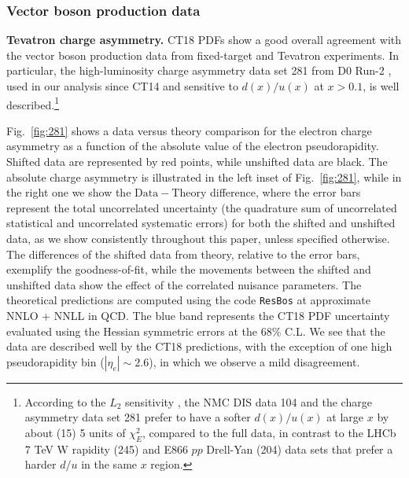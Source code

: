 \subsubsection{Vector boson production data}
\label{sec:QualityDYdata}
{\bf Tevatron charge asymmetry.}
CT18 PDFs show a good overall agreement with the vector boson production data from fixed-target and Tevatron experiments. In particular, the high-luminosity charge asymmetry data set 281 from D0 Run-2 \cite{D0:2014kma}, used in our analysis since CT14 \cite{Dulat:2015mca} and sensitive to $d(x)/u(x)$ at $x>0.1$, is well described.\footnote{According to the $L_2$ sensitivity \cite{CT18L2Sensitivity}, the NMC DIS data 104 and the charge asymmetry data set 281 prefer to have a softer $d(x)/u(x)$ at large $x$ by about (15) 5 units of $\chi^2_E$, compared to the full data, in contrast to the LHCb 7 TeV W rapidity (245) and E866 $pp$ Drell-Yan (204) data sets that prefer a harder $d/u$ in the same $x$ region.}

Fig.~\ref{fig:281} shows a data versus theory comparison for the electron charge asymmetry as a function of the absolute value of the electron pseudorapidity.
Shifted data are represented by red points, while unshifted data are black. 
The absolute charge asymmetry is illustrated in the left inset of Fig.~\ref{fig:281}, while in the right one we show the 
$\mathrm{Data}\!-\!\mathrm{Theory}$ difference, where the error bars represent the total uncorrelated uncertainty (the quadrature sum of uncorrelated statistical and uncorrelated systematic errors) for both the shifted and unshifted data, as we show consistently
throughout this paper, unless specified otherwise. The differences of the shifted data from theory, relative to the error bars, exemplify the goodness-of-fit, while the movements between the shifted and unshifted data show the effect of the correlated nuisance parameters.
The theoretical predictions are computed using the code \texttt{ResBos} at approximate NNLO + NNLL in QCD. 
The blue band represents the CT18 PDF uncertainty evaluated using the Hessian symmetric errors at 
the 68\% C.L. We see that the data are described well by the CT18 predictions, with the 
exception of one high pseudorapidity bin ($|\eta_{e}|\sim2.6$), in which we observe a mild disagreement. 



